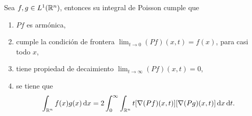\begin{theorem}\label{theo:prop-Poisson}
	Sea $f,g\in L^1(\mathbb{R}^n)$, entonces su integral de Poisson cumple que
	\begin{enumerate}
		\item $Pf$ es armónica, 
		\item cumple la condición de frontera $\lim_{t\to0}(Pf)(x, t) = f(x)$, para casi todo $x$,
		\item tiene propiedad de decaimiento $\lim_{t\to\infty}(Pf)(x, t) = 0$,
		\item se tiene que 
		\begin{equation*}
			\int_{\mathbb{R}^n} f(x)g(x)\mathop{}\!\mathrm{d} x =2 \int_0^\infty\int_{\mathbb{R}^n} t[\nabla(Pf)(x, t)][\nabla(Pg)(x, t)]\mathop{}\!\mathrm{d} x \mathop{}\!\mathrm{d} t.
		\end{equation*}
	\end{enumerate}
\end{theorem}
